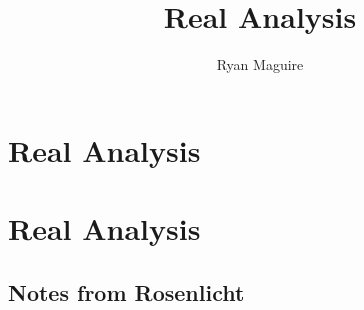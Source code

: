 \documentclass[crop=false,class=book,oneside]{standalone}
\begin{document}
    \ifx\ifmathcourses\undefined
        \title{Real Analysis}
        \author{Ryan Maguire}
        \date{\vspace{-5ex}}
        \maketitle
        \tableofcontents
        \clearpage
        \chapter*{Real Analysis}
        \vspace{10ex}
        \setcounter{chapter}{1}
    \else
        \chapter{Real Analysis}
    \fi
    \section{Notes from Rosenlicht}
\end{document}

